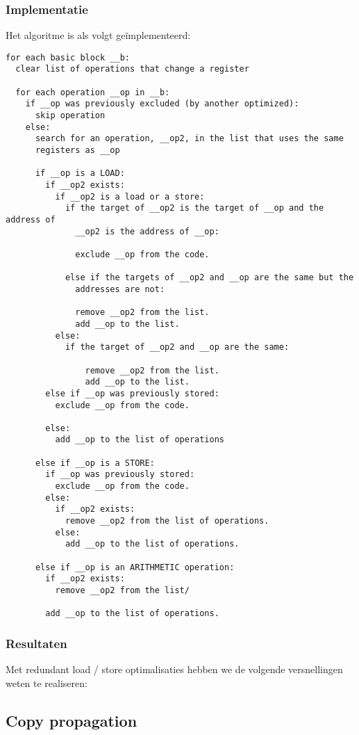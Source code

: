 \documentclass[a4paper,10pt]{article}
\begin{document}
\subsubsection{Implementatie}
Het algoritme is als volgt ge\"implementeerd:
\begin{verbatim}
for each basic block __b:
  clear list of operations that change a register

  for each operation __op in __b:
    if __op was previously excluded (by another optimized):
      skip operation
    else:
      search for an operation, __op2, in the list that uses the same
      registers as __op

      if __op is a LOAD:
        if __op2 exists:
          if __op2 is a load or a store:
            if the target of __op2 is the target of __op and the address of
              __op2 is the address of __op:

              exclude __op from the code.

            else if the targets of __op2 and __op are the same but the
              addresses are not:

              remove __op2 from the list.
              add __op to the list.
          else:
            if the target of __op2 and __op are the same:

                remove __op2 from the list.
                add __op to the list.
        else if __op was previously stored:
          exclude __op from the code.

        else:
          add __op to the list of operations

      else if __op is a STORE:
        if __op was previously stored:
          exclude __op from the code.
        else:
          if __op2 exists:
            remove __op2 from the list of operations.
          else:
            add __op to the list of operations.

      else if __op is an ARITHMETIC operation:
        if __op2 exists:
          remove __op2 from the list/

        add __op to the list of operations.
\end{verbatim}

\subsubsection{Resultaten}
Met redundant load / store optimalisaties hebben we de volgende versnellingen
weten te realiseren:

\subsection{Copy propagation}
\end{document}
